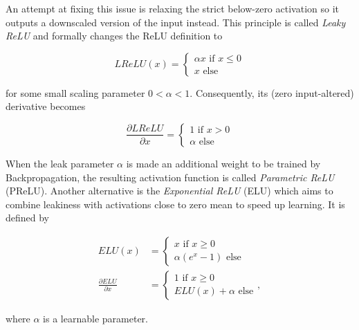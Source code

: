 An attempt at fixing this issue is relaxing the strict below-zero activation so it outputs a downscaled version of the input instead. This principle is called \textit{Leaky ReLU} \cite{lrelu} and formally changes the ReLU definition to 

\[  LReLU(x) = \begin{cases}
			\alpha x \text{ if } x \leq 0\\
			x \text{ else}
		 \end{cases}
\]

\noindent for some small scaling parameter $0 < \alpha < 1$. Consequently, its (zero input-altered) derivative becomes

\[ \frac{\partial LReLU}{\partial x} = \begin{cases}
							1 \text { if } x > 0\\
							\alpha \text{ else}
						        \end{cases}
\]

\noindent When the leak parameter $\alpha$ is made an additional weight to be trained by Backpropagation, the resulting activation function is called \textit{Parametric ReLU} (PReLU). \cite{rectifiers} Another alternative is the \textit{Exponential ReLU} (ELU) \cite{elu} which aims to combine leakiness with activations close to zero mean to speed up learning. It is defined by

\begin {align}
	ELU(x) &= \begin{cases}
			x \text { if } x \geq 0\\
			\alpha(e^x - 1) \text{ else}
		     \end{cases}\\
	\frac{\partial ELU}{\partial x} &= \begin{cases}
								1 \text { if } x \geq 0\\
								ELU(x) + \alpha \text{ else}
		    				     \end{cases},
\end {align}

\noindent where $\alpha$ is a learnable parameter.



